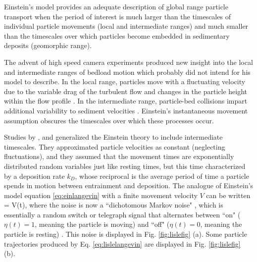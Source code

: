 Einstein's model provides an adequate description of global range particle transport when the period of interest is much larger than the timescales of individual particle movements (local and intermediate ranges) and much smaller than the timescales over which particles become embedded in sedimentary deposits (geomorphic range).

The advent of high speed camera experiments produced new insight into the local and intermediate ranges of bedload motion \citep{Abbott1977,Francis1973,Drake1988} which \citet{Einstein1937} probably did not intend for his model to describe.
In the local range, particles move with a fluctuating velocity due to the variable drag of the turbulent flow \citep{Lajeunesse2010,Fathel2015} and changes in the particle height within the flow profile \citep{VanRijn1984,Wiberg1985}.
In the intermediate range, particle-bed collisions impart additional variability to sediment velocities \citep{Gordon1972,Martin2013}.
Einstein's instantaneous movement assumption obscures the timescales over which these processes occur.

Studies by \citet{Lisle1998}, and \citet{Lajeunesse2017} generalized the Einstein theory to include intermediate timescales. They approximated particle velocities as constant (neglecting fluctuations), and they assumed that the movement times are exponentially distributed random variables just like resting times, but this time characterized by a deposition rate $k_D$, whose reciprocal is the average period of time a particle spends in motion between entrainment and deposition.
The analogue of Einstein's model equation \ref{eq:einlangevin} with a finite movement velocity $V$ can be written
\be {} = V\eta(t), \label{eq:lislelangevin}\ee
where the noise is now a ``dichotomous Markov noise" \citep{VanDenBroeck1990,Bena2006}, which is essentially a random switch or telegraph signal that alternates between ``on" ($\eta(t) = 1$, meaning the particle is moving) and ``off" ($\eta(t) = 0$, meaning the particle is resting) \citep{Cox1965,Horsthemke1984, Masoliver1991, Masoliver1996}.
This noise is displayed in Fig. \ref{fig:lislefig} (a). Some particle trajectories produced by Eq. \ref{eq:lislelangevin} are displayed in Fig. \ref{fig:lislefig} (b).

